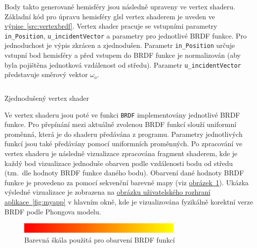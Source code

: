 \documentclass[czech,master]{diploma}
\newcommand{\outVec}{\omega_{o}}
\begin{document}
Body takto generované hemisféry jsou následně upraveny ve vertex shaderu. Základní kód pro úpravu hemisféry glsl vertex shaderem je uveden ve \hyperref[src:vertexbrdf]{výpise~\ref{src:vertexbrdf}}. Vertex shader pracuje se vstupními parametry \texttt{in\_Position}, \texttt{u\_incidentVector} a parametry pro jednotlivé BRDF funkce. Pro jednoduchost je výpis zkrácen a zjednodušen. Parametr \texttt{in\_Position} určuje vstupní bod hemisféry a před vstupem do BRDF funkce je normalizován (aby byla pojištěna jednotková vzdálenost od středu). Parametr \texttt{u\_incidentVector} představuje směrový vektor \(\outVec\).\par

\begin{listing}[ht]
  \inputminted{c++}{sampleshader.glsl}
  \caption{Zjednodušený vertex shader}
  \label{src:vertexbrdf}
\end{listing}

Ve vertex shaderu jsou poté ve funkci \texttt{BRDF} implementovány jednotlivé BRDF funkce. Pro přepínání mezi aktuálně zvolenou BRDF funkcí slouží uniformní proměnná, která je do shaderu předávána z programu. Parametry jednotlivých funkcí jsou také předávány pomocí uniformních proměnných. Po zpracování ve vertex shaderu je následně vizualizace zpracována fragment shaderem, kde je každý bod vizualizace jednoduše obarven podle vzdálenosti bodu od středu (tzn.\ dle hodnoty BRDF funkce daného bodu). Obarvení dané hodnoty BRDF funkce je provedeno za pomocí sekvenční barevné mapy  (viz \hyperref[fig:colormap]{obrázek~\ref{fig:colormap}}). Ukázka výsledné vizualizace je zobrazena na \hyperref[fig:myapp]{obrázku uživatelského rozhraní aplikace~\ref{fig:myapp}} v hlavním okně, kde je vizualizována fyzikálně korektní verze BRDF podle Phongova modelu.

\begin{figure}[ht]
  \centering
  \includegraphics[width=8cm]{Figures/MATLAB_autumn.png}
  \caption{Barevná škála použitá pro obarvení BRDF funkcí}%
  \label{fig:colormap}%
\end{figure}

\clearpage
\end{document}
